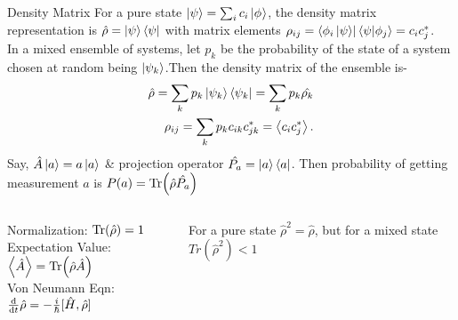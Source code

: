 \documentclass[pdf]{beamer}
\begin{document}
\begin{frame}{Density Matrix}
  For a pure state $\ket{\psi}=\sum_{i} c_{i} \ket{\phi_{}  }  $, the density matrix representation is $ \hat{\rho} = \ket{\psi}\bra{\psi} $ with matrix elements $ \rho_{ij} = \bra{\phi_{i} \ket{\psi} } \bra{\psi}\ket{\phi_{j}  } = c_{i} c_{j} ^{*}      $. \\
   
  In a mixed ensemble of systems, let $ p_{k}   $ be the probability of the state of a system chosen at random being
   $ \ket{\psi_{k}}$.Then the density matrix of the ensemble is-
   \begin{align*}
            \hat{\rho} = \sum_{k} p_{k} \ket{\psi_{k}  } \bra{\psi_{k}  } = \sum_{k} p_{k} \hat{\rho_{k}  } \\ 
       \rho_{ij} = \sum_{k} p_{k} c_{ik}c_{jk}^{*} = \ev{c_{i} c_{j} ^{*}  }
   .\end{align*}
   Say, $ \hat{A}\ket{a} = a \ket{a} $ \& projection operator $ \hat{P_{a}} = \ket{a}\bra{a} $. Then probability of getting measurement $ a $
   is $ P(a) = \Tr( \hat{\rho} \hat{P_{a}  }) $ \\

   \begin{columns}
     \begin{column}{0.6\textwidth}
   Normalization: $ \Tr( \hat{\rho}) = 1$ \\
   Expectation Value: $ \ev{ \hat{A}} = \Tr( \hat{\rho} \hat{A}) $ \\ 
   Von Neumann Eqn: $ \dv{t} \hat{\rho} = -\frac{i}{\hbar} [\hat{H},\hat{\rho}]  $
     \end{column}
     \begin{column}{0.4\textwidth}
      For a pure state $ \hat{\rho}^{2} = \hat{\rho}  $, but for a mixed state $ Tr( \hat{\rho}^2) <1  $ 
     \end{column}
   \end{columns}
\end{frame}
\end{document}
